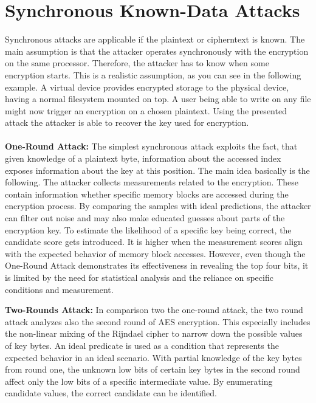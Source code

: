 \section{Synchronous Known-Data Attacks}

Synchronous attacks are applicable if the plaintext or cipherntext is known. The main assumption is that the attacker operates synchronously with the encryption on the same processor. Therefore, the attacker has to know when some encryption starts. This is a realistic assumption, as you can see in the following example. 
A virtual device provides encrypted storage to the physical device, having a normal filesystem mounted on top. A user being able to write on any file might now trigger an encryption on a chosen plaintext. Using the presented attack the attacker is able to recover the key used for encryption. 

\paragraph{}
\textbf{One-Round Attack:} The simplest synchronous attack exploits the fact, that given knowledge of a plaintext byte, information about the accessed index exposes information about the key at this position. The main idea basically is the following. The attacker collects measurements related to the encryption. These contain information whether specific memory blocks are accessed during the encryption process. By comparing the samples with ideal predictions, the attacker can filter out noise and may also make educated guesses about parts of the encryption key. To estimate the likelihood of a specific key being correct, the candidate score gets introduced. It is higher when the measurement scores align with the expected behavior of memory block accesses. 
However, even though the One-Round Attack demonstrates its effectiveness in revealing the top four bits, it is limited by the need for statistical analysis and the reliance on specific conditions and measurement.


\textbf{Two-Rounds Attack:}
In comparison two the one-round attack, the two round attack analyzes also the second round of AES encryption. This especially includes the non-linear mixing of the Rijndael cipher to narrow down the possible values of key bytes. 
An ideal predicate is used as a condition that represents the expected behavior in an ideal scenario. With partial knowledge of the key bytes from round one, the unknown low bits of certain key bytes in the second round affect only the low bits of a specific intermediate value. By enumerating candidate values, the correct candidate can be identified.

